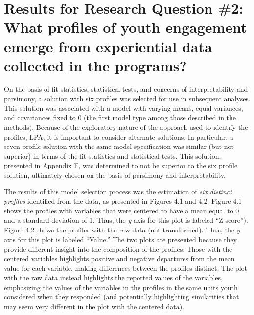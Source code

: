 \documentclass[]{msu-thesis}
\theoremstyle{definition}
\theoremstyle{definition}
\theoremstyle{definition}
\theoremstyle{remark}
\begin{document}
\section{Results for Research Question \#2: What profiles of youth
engagement emerge from experiential data collected in the
programs?}\label{results-for-research-question-2-what-profiles-of-youth-engagement-emerge-from-experiential-data-collected-in-the-programs}

On the basis of fit statistics, statistical tests, and concerns of
interpretability and parsimony, a solution with six profiles was
selected for use in subsequent analyses. This solution was associated
with a model with varying means, equal variances, and covariances fixed
to 0 (the first model type among those described in the methods).
Because of the exploratory nature of the approach used to identify the
profiles, LPA, it is important to consider alternate solutions. In
particular, a seven profile solution with the same model specification
was similar (but not superior) in terms of the fit statistics and
statistical tests. This solution, presented in Appendix F, was
determined to not be superior to the six profile solution, ultimately
chosen on the basis of parsimony and interpretability.

The results of this model selection process was the estimation of
\emph{six distinct profiles} identified from the data, as presented in
Figures 4.1 and 4.2. Figure 4.1 shows the profiles with variables that
were centered to have a mean equal to 0 and a standard deviation of 1.
Thus, the \emph{y}-axis for this plot is labeled ``Z-score''). Figure
4.2 shows the profiles with the raw data (not transformed). Thus, the
\emph{y}-axis for this plot is labeled ``Value.'' The two plots are
presented because they provide different insight into the composition of
the profiles: Those with the centered variables highlights positive and
negative departures from the mean value for each variable, making
differences between the profiles distinct. The plot with the raw data
instead highlights the reported values of the variables, emphasizing the
values of the variables in the profiles in the same units youth
considered when they responded (and potentially highlighting
similarities that may seem very different in the plot with the centered
data).
\end{document}
